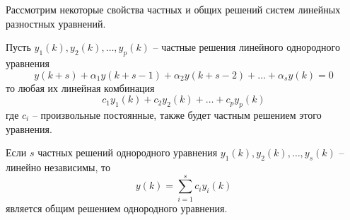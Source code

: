 Рассмотрим некоторые свойства частных и общих решений систем линейных разностных уравнений.
\begin{theorem}
    Пусть $\displaystyle y_1(k), y_2(k), \dots, y_p(k)$ -- частные решения линейного однородного уравнения
    \begin{equation}
        y(k+s) + \alpha_1 y(k+s-1) + \alpha_2 y(k+s-2) + \dots + \alpha_s y(k) = 0\label{eq:diff-s1}
    \end{equation}
    то любая их линейная комбинация
    \begin{equation*}
        c_1 y_1 (k) + c_2 y_2 (k) + \dots + c_p y_p (k)
    \end{equation*}
    где $\displaystyle c_i$ -- произвольные постоянные, также будет частным решением этого уравнения.
\end{theorem}
\begin{theorem}
    Если $s$ частных решений однородного уравнения $\displaystyle y_1(k), y_2(k), \dots, y_s(k)$ -- линейно независимы, то
    \begin{equation}
        y(k) = \sum_{i=1}^{s} c_i y_i (k)\label{eq:diff-s2}
    \end{equation}
    является общим решением однородного уравнения.
\end{theorem}

